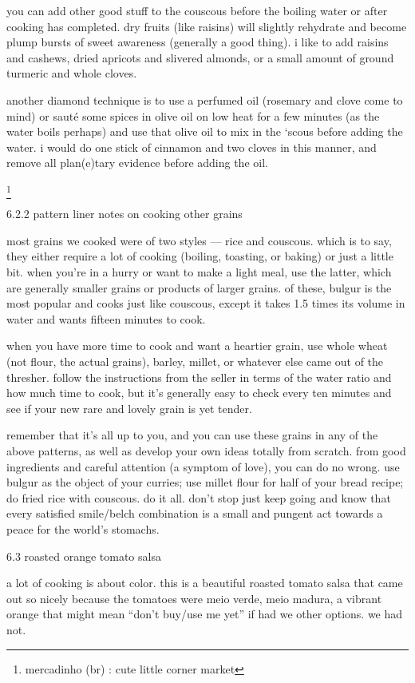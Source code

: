 you can add other good stuff to the couscous before the boiling water or after cooking has completed. dry fruits (like raisins) will slightly rehydrate and become plump bursts of sweet awareness (generally a good thing). i like to add raisins and cashews, dried apricots and slivered almonds, or a small amount of ground turmeric and whole cloves. 

another diamond technique is to use a perfumed oil (rosemary and clove come to mind) or saut\'{e} some spices in olive oil on low heat for a few minutes (as the water boils perhaps) and use that olive oil to mix in the `scous before adding the water. i would do one stick of cinnamon and two cloves in this manner, and remove all plan(e)tary evidence before adding the oil.

\footnote{mercadinho (br) : cute little corner market}

6.2.2  pattern liner notes on cooking other grains

most grains we cooked were of two styles --- rice and couscous. which is to say, they either require a lot of cooking (boiling, toasting, or baking) or just a little bit. when you're in a hurry or want to make a light meal, use the latter, which are generally smaller grains or products of larger grains.
          of these, bulgur is the most popular and cooks just like couscous, except it takes 1.5 times its volume in water and wants fifteen minutes to cook.

when you have more time to cook and want a heartier grain, use whole wheat (not flour, the actual grains), barley, millet, or whatever else came out of the thresher. follow the instructions from the seller in terms of the water ratio and how much time to cook, but it's generally easy to check every ten minutes and see if your new rare and lovely grain is yet tender.

remember that it's all up to you, and you can use these grains in any of the above patterns, as well as develop your own ideas totally from scratch. from good ingredients and careful attention (a symptom of love), you can do no wrong. use bulgur as the object of your curries; use millet flour for half of your bread recipe; do fried rice with couscous. do it all. don't stop just keep going and know that every satisfied smile/belch combination is a small and pungent act towards a peace for the world's stomachs.

6.3  roasted orange tomato salsa

a lot of cooking is about color. this is a beautiful roasted tomato salsa that came out so nicely because the tomatoes were meio verde, meio madura, a vibrant orange that might mean ``don't buy/use me yet'' if had we other options. we had not.

